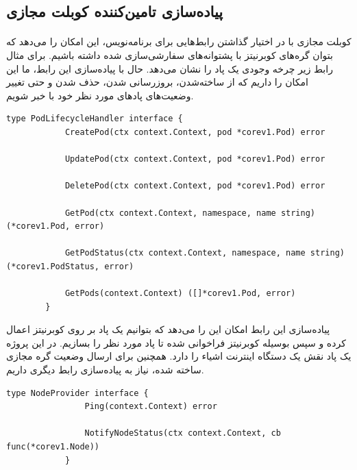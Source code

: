 \subsection{پیاده‌سازی تامین‌کننده کوبلت مجازی}
\label{subsec:provider}
\paragraph{}
{
    کوبلت مجازی با در اختیار گذاشتن رابط‌هایی برای برنامه‌نویس، این امکان را می‌دهد که بتوان گره‌های کوبرنیتز با پشتوانه‌های
    سفارشی‌سازی شده داشته باشیم. برای مثال رابط زیر چرخه وجودی یک پاد را نشان می‌دهد. حال با پیاده‌سازی این رابط، ما این امکان
    را داریم که از ساخته‌شدن، بروزرسانی شدن، حذف شدن و حتی تغییر وضعیت‌های پاد‌های مورد نظر خود با خبر شویم.
    \newpage
    \begin{latin}
    \begin{lstlisting}[caption=پاد وجودی چرخه کنترل‌کننده رابط]
        type PodLifecycleHandler interface {
            CreatePod(ctx context.Context, pod *corev1.Pod) error
        
            UpdatePod(ctx context.Context, pod *corev1.Pod) error
        
            DeletePod(ctx context.Context, pod *corev1.Pod) error
        
            GetPod(ctx context.Context, namespace, name string) (*corev1.Pod, error)
        
            GetPodStatus(ctx context.Context, namespace, name string) (*corev1.PodStatus, error)
        
            GetPods(context.Context) ([]*corev1.Pod, error)
        }        
    \end{lstlisting}
    \end{latin}

    پیاده‌سازی این رابط امکان این را می‌دهد که بتوانیم یک پاد بر روی کوبرنیتز اعمال کرده و سپس بوسیله کوبرنیتز فراخوانی شده تا پاد مورد نظر را بسازیم. در  این پروژه یک پاد نقش یک دستگاه اینترنت اشیاء را دارد.
    همچنین برای ارسال وضعیت گره مجازی ساخته شده، نیاز به پیاده‌سازی رابط دیگری داریم.

    \begin{latin}
        \begin{lstlisting}[caption={گره وضعیت کنترل‌کننده رابط}]
            type NodeProvider interface {
                Ping(context.Context) error

                NotifyNodeStatus(ctx context.Context, cb func(*corev1.Node))
            }


\end{lstlisting}
\end{latin}}
